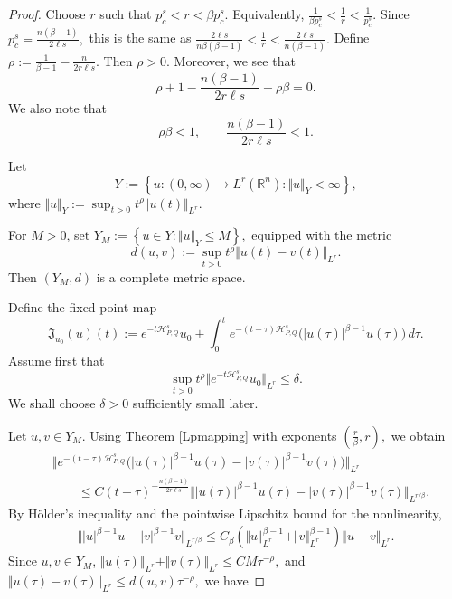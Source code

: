 \documentclass[10pt,a4paper]{amsart}
\newcommand{\APQ}{\mathcal{H}_{P, Q}}
\begin{document}
\begin{proof}
Choose $r$ such that $p_c^s<r<\beta p_c^s.$
Equivalently, $ \frac{1}{\beta p_c^s}
<\frac1r<
    \frac1{p_c^s}.$
Since $ p_c^s=\frac{n(\beta-1)}{2\ell s},$
this is the same as $ \frac{2\ell s}{n\beta(\beta-1)} <
    \frac{1}{r}   <
    \frac{2\ell s}{n(\beta-1)}.$
Define $\rho :=
    \frac{1}{\beta-1} -
    \frac{n}{2r\ell s}.$
Then $\rho>0$. Moreover, we see that 
\begin{equation}
\label{lessone}
    \rho +1-
    \frac{n(\beta-1)}{2r\ell s}-
    \rho\beta =0.
\end{equation}
We also note that
\[
    \rho\beta<1,
    \qquad
    \frac{n(\beta-1)}{2r\ell s}<1.
\]

Let
\[
    Y
    :=
    \left\{
    u:(0,\infty)\to L^r(\mathbb R^n):
    \Vert u\Vert_Y<\infty
    \right\},
\]
where $\Vert u\Vert_Y
    :=
    \sup_{t>0}
    t^\rho
    \Vert u(t)\Vert_{L^r}.$
    
For $M>0$, set $Y_M
    :=
    \left\{
    u\in Y:
    \Vert u\Vert_Y\leq M
    \right\},$
equipped with the metric $$d(u,v)
    :=
    \sup_{t>0}
    t^\rho
    \Vert u(t)-v(t)\Vert_{L^r}.$$
Then $(Y_M,d)$ is a complete metric space.

Define the fixed-point map
\[
    \mathfrak J_{u_0}(u)(t)
    :=
    e^{-t\APQ^s}u_0
    +
    \int_0^t
    e^{-(t-\tau)\APQ^s}
    \big(|u(\tau)|^{\beta-1}u(\tau)\big)
    \,d\tau.
\]
Assume first that
\begin{equation}
\label{6.11}
    \sup_{t>0}
    t^\rho
    \Vert e^{-t\APQ^s}u_0\Vert_{L^r}
    \leq
    \delta.
\end{equation}
We shall choose $\delta>0$ sufficiently small later.

Let $u,v\in Y_M$. Using Theorem \ref{Lpmapping} with exponents $ \left(\frac r\beta,r\right),$
we obtain
\[
\begin{aligned}
&\Vert
e^{-(t-\tau)\APQ^s}
\big(
|u(\tau)|^{\beta-1}u(\tau)
-
|v(\tau)|^{\beta-1}v(\tau)
\big)
\Vert_{L^r}
\\
&\qquad
\leq
C
(t-\tau)^{-\frac{n(\beta-1)}{2r\ell s}}
\Vert
|u(\tau)|^{\beta-1}u(\tau)
-
|v(\tau)|^{\beta-1}v(\tau)
\Vert_{L^{r/\beta}}.
\end{aligned}
\]
By H\"older's inequality and the pointwise Lipschitz bound for the nonlinearity,
\[
\begin{aligned}
\Vert
|u|^{\beta-1}u
-
|v|^{\beta-1}v
\Vert_{L^{r/\beta}}
\leq
C_\beta
\left(
\Vert u\Vert_{L^r}^{\beta-1}
+
\Vert v\Vert_{L^r}^{\beta-1}
\right)
\Vert u-v\Vert_{L^r}.
\end{aligned}
\]
Since $u,v\in Y_M$, $\Vert u(\tau)\Vert_{L^r} +
    \Vert v(\tau)\Vert_{L^r}
    \leq C M\tau^{-\rho},$
and $\Vert u(\tau)-v(\tau)\Vert_{L^r}
    \leq
    d(u,v)\tau^{-\rho},$ we have


\end{proof}
\end{document}
